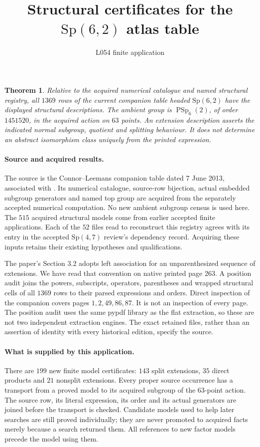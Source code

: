 \documentclass[11pt]{article}
\title{Structural certificates for the $\mathrm{Sp}(6,2)$ atlas table}
\author{L054 finite application}\date{}
\newtheorem{theorem}{Theorem}
\begin{document}
\maketitle

\begin{theorem}
Relative to the acquired numerical catalogue and named structural registry,
all $1369$ rows of the current companion table headed $\mathrm{Sp}(6,2)$
have the displayed structural descriptions. The ambient group is
$\operatorname{PSp}_6(2)$, of order $1451520$, in the acquired action on
$63$ points. An extension description asserts the indicated normal
subgroup, quotient and splitting behaviour. It does not determine an
abstract isomorphism class uniquely from the printed expression.
\end{theorem}

\paragraph{Source and acquired results.}
The source is the Connor--Leemans companion table dated 7 June 2013,
associated with \cite{atlas}. Its numerical catalogue, source-row
bijection, actual embedded subgroup generators and named top group are
acquired from the separately accepted numerical computation. No new
ambient subgroup census is used here. The $515$ acquired structural models
come from earlier accepted finite applications. Each of the $52$ files
read to reconstruct this registry agrees with its entry in the accepted
$\mathrm{Sp}(4,7)$ review's dependency record. Acquiring these inputs
retains their existing hypotheses and qualifications.

The paper's Section 3.2 adopts left association for an unparenthesized
sequence of extensions. We have read that convention on native printed
page 263. A position audit joins the powers, subscripts, operators,
parentheses and wrapped structural cells of all $1369$ rows to their parsed
expressions and orders. Direct inspection of the companion covers pages
$1,2,49,86,87$. It is not an inspection of every page. The position audit
uses the same pypdf library as the flat extraction, so these are not two
independent extraction engines. The exact retained files, rather than an
assertion of identity with every historical edition, specify the source.

\paragraph{What is supplied by this application.}
There are $199$ new finite model certificates: $143$ split extensions,
$35$ direct products and $21$ nonsplit extensions. Every proper source
occurrence has a transport from a proved model to its acquired subgroup
of the $63$-point action. The source row, its literal expression, its order
and its actual generators are joined before the transport is checked.
Candidate models used to help later searches are still proved individually;
they are never promoted to acquired facts merely because a search returned
them. All references to new factor models precede the model using them.
\end{document}
